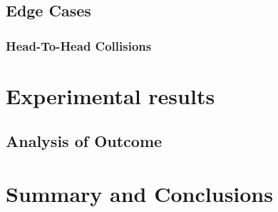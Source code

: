 \documentclass[a4paper,12pt]{article}
\begin{document}
\subsection{Edge Cases}



\subsubsection{Head-To-Head Collisions}






\newpage
\section{Experimental results}
\label{sec:exps}



\subsection{Analysis of Outcome}



\newpage
\section{Summary and Conclusions}
\label{sec:summary}



\clearpage


\end{document}
